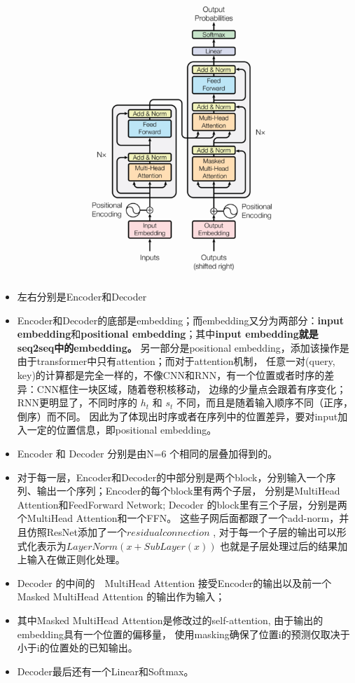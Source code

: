 \documentclass[UTF8,a4paper,10pt]{ctexart}
\begin{document}
\begin{figure}
\centering
\includegraphics[scale=0.6]{pics/190417-arch.png}
\end{figure}
\begin{itemize}
  \item  左右分别是Encoder和Decoder
  \item Encoder和Decoder的底部是embedding；而embedding又分为两部分：\textbf{input embedding}和\textbf{positional embedding}；其中\textbf{input embedding就是seq2seq中的embedding。}
    另一部分是positional embedding，添加该操作是由于transformer中只有attention；而对于attention机制，
    任意一对(query, key)的计算都是完全一样的，不像CNN和RNN，有一个位置或者时序的差异：CNN框住一块区域，随着卷积核移动，
    边缘的少量点会跟着有序变化；RNN更明显了，不同时序的 $h_t$ 和 $s_t$ 不同，而且是随着输入顺序不同（正序，倒序）而不同。
    因此为了体现出时序或者在序列中的位置差异，要对input加入一定的位置信息，即positional embedding。
  \item Encoder 和 Decoder 分别是由N=6 个相同的层叠加得到的。
  \item 对于每一层，Encoder和Decoder的中部分别是两个block，分别输入一个序列、输出一个序列；Encoder的每个block里有两个子层，
    分别是MultiHead Attention和FeedForward Network; Decoder 的block里有三个子层，分别是两个MultiHead Attention和一个FFN。
    这些子网后面都跟了一个add-norm，并且仿照ResNet添加了一个$residual connection$ ,
    对于每一个子层的输出可以形式化表示为$LayerNorm(x + SubLayer(x))$ 也就是子层处理过后的结果加上输入在做正则化处理。
  \item Decoder 的中间的　MultiHead Attention 接受Encoder的输出以及前一个Masked MultiHead Attention 的输出作为输入；
  \item 其中Masked MultiHead Attention是修改过的self-attention, 由于输出的embedding具有一个位置的偏移量，
    使用masking确保了位置i的预测仅取决于小于i的位置处的已知输出。
  \item Decoder最后还有一个Linear和Softmax。
\end{itemize}
\end{document}
